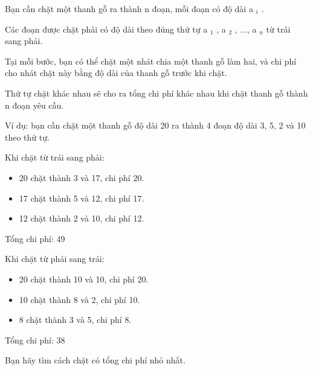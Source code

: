 Bạn cần chặt một thanh gỗ ra thành n đoạn, mỗi đoạn có độ dài a $_ i $ .

Các đoạn được chặt phải có độ dài theo đúng thứ tự a $_ 1 $ , a $_ 2 $ , ..., a $_ n $ từ trái sang phải.

Tại mỗi bước, bạn có thể chặt một nhát chia một thanh gỗ làm hai, và chi phí cho nhát chặt này bằng độ dài của thanh gỗ trước khi chặt.

Thứ tự chặt khác nhau sẽ cho ra tổng chi phí khác nhau khi chặt thanh gỗ thành n đoạn yêu cầu.

Ví dụ: bạn cần chặt một thanh gỗ độ dài 20 ra thành 4 đoạn độ dài 3, 5, 2 và 10 theo thứ tự.

Khi chặt từ trái sang phải:
\begin{itemize}
	\item 20 chặt thành 3 và 17, chi phí 20.
	\item 17 chặt thành 5 và 12, chi phí 17.
	\item 12 chặt thành 2 và 10, chi phí 12.
\end{itemize}

Tổng chi phí: 49

Khi chặt từ phải sang trái:
\begin{itemize}
	\item 20 chặt thành 10 và 10, chi phí 20.
	\item 10 chặt thành 8 và 2, chi phí 10.
	\item 8 chặt thành 3 và 5, chi phí 8.
\end{itemize}

Tổng chi phí: 38

Bạn hãy tìm cách chặt có tổng chi phí nhỏ nhất.

\